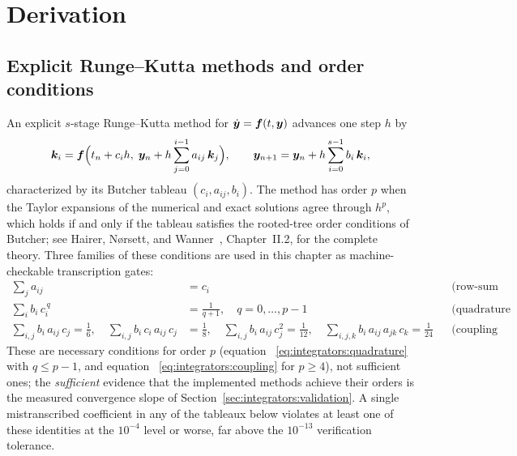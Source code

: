 \section{Derivation}
\label{sec:integrators:derivation}

\subsection{Explicit Runge--Kutta methods and order conditions}

An explicit $s$-stage Runge--Kutta method for
$\dot{\bm{y}} = \bm{f}(t, \bm{y})$ advances one step $h$ by
\begin{equation}
  \bm{k}_i = \bm{f}\Bigl(t_n + c_i h,\;
    \bm{y}_n + h \sum_{j=0}^{i-1} a_{ij}\, \bm{k}_j\Bigr),
  \qquad
  \bm{y}_{n+1} = \bm{y}_n + h \sum_{i=0}^{s-1} b_i\, \bm{k}_i,
  \label{eq:integrators:erk}
\end{equation}
characterized by its Butcher tableau $(c_i, a_{ij}, b_i)$. The method has
order $p$ when the Taylor expansions of the numerical and exact solutions
agree through $h^{p}$, which holds if and only if the tableau satisfies the
rooted-tree order conditions of Butcher; see Hairer, N{\o}rsett, and
Wanner~\cite{hairer1993}, Chapter~II.2, for the complete theory. Three
families of these conditions are used in this chapter as machine-checkable
transcription gates:
\begin{align}
  \sum_{j} a_{ij} &= c_i
    &&\text{(row-sum convention),}
    \label{eq:integrators:rowsum}\\
  \sum_{i} b_i\, c_i^{\,q} &= \frac{1}{q+1},
    \quad q = 0, \dots, p - 1
    &&\text{(quadrature conditions),}
    \label{eq:integrators:quadrature}\\
  \sum_{i,j} b_i\, a_{ij}\, c_j = \tfrac{1}{6},
  \quad
  \sum_{i,j} b_i\, c_i\, a_{ij}\, c_j &= \tfrac{1}{8},
  \quad
  \sum_{i,j} b_i\, a_{ij}\, c_j^{2} = \tfrac{1}{12},
  \quad
  \sum_{i,j,k} b_i\, a_{ij}\, a_{jk}\, c_k = \tfrac{1}{24}
    &&\text{(coupling conditions of orders 3--4).}
    \label{eq:integrators:coupling}
\end{align}
These are necessary conditions for order $p$ (equation~%
\eqref{eq:integrators:quadrature} with $q \le p-1$, and equation~%
\eqref{eq:integrators:coupling} for $p \ge 4$), not sufficient ones; the
\emph{sufficient} evidence that the implemented methods achieve their orders
is the measured convergence slope of
Section~\ref{sec:integrators:validation}. A single mistranscribed
coefficient in any of the tableaux below violates at least one of these
identities at the $10^{-4}$ level or worse, far above the $10^{-13}$
verification tolerance.


